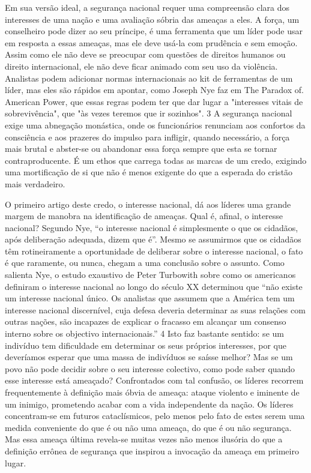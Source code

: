Em sua versão ideal, a segurança nacional requer uma compreensão clara dos interesses de uma nação e uma avaliação sóbria das ameaças a eles. A força, um conselheiro pode dizer ao seu príncipe, é uma ferramenta que um líder pode usar em resposta a essas ameaças, mas ele deve usá-la com prudência e sem emoção. Assim como ele não deve se preocupar com questões de direitos humanos ou direito internacional, ele não deve ficar animado com seu uso da violência. Analistas podem adicionar normas internacionais ao kit de ferramentas de um líder, mas eles são rápidos em apontar, como Joseph Nye faz em The Paradox of. American Power, que essas regras podem ter que dar lugar a "interesses vitais de sobrevivência", que "às vezes teremos que ir sozinhos".
 {\color{blue} 3}  
A segurança nacional exige uma abnegação monástica, onde os funcionários renunciam aos confortos da consciência e aos prazeres do impulso para infligir, quando necessário, a força mais brutal e abster-se ou abandonar essa força sempre que esta se tornar contraproducente. É um ethos que carrega todas as marcas de um credo, exigindo uma mortificação de si que não é menos exigente do que a esperada do cristão mais verdadeiro.
 
\par
 
O primeiro artigo deste credo, o interesse nacional, dá aos líderes uma grande margem de manobra na identificação de ameaças. Qual é, afinal, o interesse nacional? Segundo Nye, “o interesse nacional é simplesmente o que os cidadãos, após deliberação adequada, dizem que é”. Mesmo se assumirmos que os cidadãos têm rotineiramente a oportunidade de deliberar sobre o interesse nacional, o fato é que raramente, ou nunca, chegam a uma conclusão sobre o assunto. Como salienta Nye, o estudo exaustivo de Peter Turbowith sobre como os americanos definiram o interesse nacional ao longo do século XX determinou que “não existe um interesse nacional único. Os analistas que assumem que a América tem um interesse nacional discernível, cuja defesa deveria determinar as suas relações com outras nações, são incapazes de explicar o fracasso em alcançar um consenso interno sobre os objectivo internacionais.”
 {\color{blue} 4}  
Isto faz bastante sentido: se um indivíduo tem dificuldade em determinar os seus próprios interesses, por que deveríamos esperar que uma massa de indivíduos se saísse melhor? Mas se um povo não pode decidir sobre o seu interesse colectivo, como pode saber quando esse interesse está ameaçado? Confrontados com tal confusão, os líderes recorrem frequentemente à definição mais óbvia de ameaça: ataque violento e iminente de um inimigo, prometendo acabar com a vida independente da nação. Os líderes concentram-se em futuros cataclísmicos, pelo menos pelo fato de estes serem uma medida conveniente do que é ou não uma ameaça, do que é ou não segurança. Mas essa ameaça última revela-se muitas vezes não menos ilusória do que a definição errônea de segurança que inspirou a invocação da ameaça em primeiro lugar.
 
